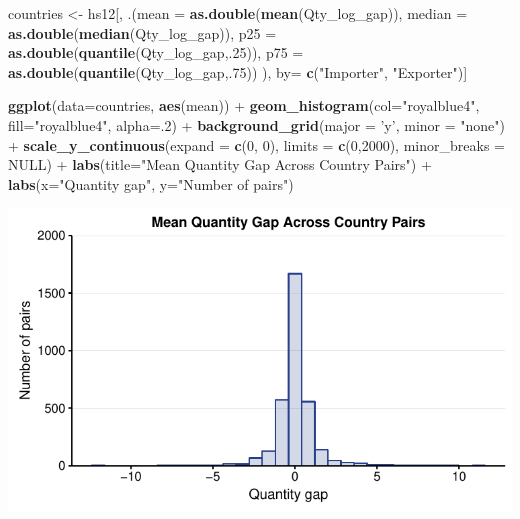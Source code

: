 \documentclass[10pt,]{article}
\newenvironment{Shaded}{\begin{snugshade}}{\end{snugshade}}
\newcommand{\KeywordTok}[1]{\textcolor[rgb]{0.13,0.29,0.53}{\textbf{{#1}}}}
\newcommand{\DataTypeTok}[1]{\textcolor[rgb]{0.13,0.29,0.53}{{#1}}}
\newcommand{\DecValTok}[1]{\textcolor[rgb]{0.00,0.00,0.81}{{#1}}}
\newcommand{\StringTok}[1]{\textcolor[rgb]{0.31,0.60,0.02}{{#1}}}
\newcommand{\OtherTok}[1]{\textcolor[rgb]{0.56,0.35,0.01}{{#1}}}
\newcommand{\NormalTok}[1]{{#1}}
\begin{document}
\begin{Shaded}
\begin{Highlighting}[]
\NormalTok{countries <-}\StringTok{ }\NormalTok{hs12[, .(}\DataTypeTok{mean =} \KeywordTok{as.double}\NormalTok{(}\KeywordTok{mean}\NormalTok{(Qty_log_gap)),}
                      \DataTypeTok{median =} \KeywordTok{as.double}\NormalTok{(}\KeywordTok{median}\NormalTok{(Qty_log_gap)),}
                      \DataTypeTok{p25 =} \KeywordTok{as.double}\NormalTok{(}\KeywordTok{quantile}\NormalTok{(Qty_log_gap,.}\DecValTok{25}\NormalTok{)),}
                      \DataTypeTok{p75 =} \KeywordTok{as.double}\NormalTok{(}\KeywordTok{quantile}\NormalTok{(Qty_log_gap,.}\DecValTok{75}\NormalTok{))}
\NormalTok{),}
\NormalTok{by=}\StringTok{ }\KeywordTok{c}\NormalTok{(}\StringTok{"Importer"}\NormalTok{, }\StringTok{"Exporter"}\NormalTok{)]}

\KeywordTok{ggplot}\NormalTok{(}\DataTypeTok{data=}\NormalTok{countries, }\KeywordTok{aes}\NormalTok{(mean)) +}
\StringTok{  }\KeywordTok{geom_histogram}\NormalTok{(}\DataTypeTok{col=}\StringTok{"royalblue4"}\NormalTok{,}
                 \DataTypeTok{fill=}\StringTok{"royalblue4"}\NormalTok{,}
                 \DataTypeTok{alpha=}\NormalTok{.}\DecValTok{2}\NormalTok{) +}
\StringTok{  }\KeywordTok{background_grid}\NormalTok{(}\DataTypeTok{major =} \StringTok{'y'}\NormalTok{, }\DataTypeTok{minor =} \StringTok{"none"}\NormalTok{) +}
\StringTok{  }\KeywordTok{scale_y_continuous}\NormalTok{(}\DataTypeTok{expand =} \KeywordTok{c}\NormalTok{(}\DecValTok{0}\NormalTok{, }\DecValTok{0}\NormalTok{), }\DataTypeTok{limits =} \KeywordTok{c}\NormalTok{(}\DecValTok{0}\NormalTok{,}\DecValTok{2000}\NormalTok{), }\DataTypeTok{minor_breaks =} \OtherTok{NULL}\NormalTok{) +}
\StringTok{  }\KeywordTok{labs}\NormalTok{(}\DataTypeTok{title=}\StringTok{"Mean Quantity Gap Across Country Pairs"}\NormalTok{) +}
\StringTok{  }\KeywordTok{labs}\NormalTok{(}\DataTypeTok{x=}\StringTok{"Quantity gap"}\NormalTok{, }\DataTypeTok{y=}\StringTok{"Number of pairs"}\NormalTok{)}
\end{Highlighting}
\end{Shaded}

\begin{center}\includegraphics{Figs/quantity_pairs-1} \end{center}
\end{document}

